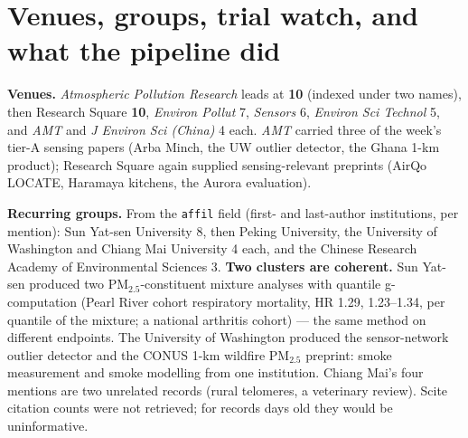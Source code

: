 \documentclass[10pt]{article}
\begin{document}
\vspace{4mm}

\par{}\baselineskip{}\baselineskip
\section*{\sffamily\bfseries\color{Deep}Venues, groups, trial watch, and what the pipeline did}
\vspace{-1.5mm}{\color{Teal}\rule{\linewidth}{1.1pt}}\vspace{2.5mm}

\footnotesize
\textbf{Venues.} \textit{Atmospheric Pollution Research} leads at \textbf{10} (indexed under two names), then
Research Square \textbf{10}, \textit{Environ Pollut} 7, \textit{Sensors} 6, \textit{Environ Sci Technol} 5, and
\textit{AMT} and \textit{J Environ Sci (China)} 4 each. \textit{AMT} carried three of the week's tier-A sensing papers
(Arba Minch, the UW outlier detector, the Ghana 1-km product); Research Square again supplied sensing-relevant
preprints (AirQo LOCATE, Haramaya kitchens, the Aurora evaluation).

\vspace{1.5mm}
\textbf{Recurring groups.} From the \texttt{affil} field (first- and last-author institutions, per mention): Sun
Yat-sen University 8, then Peking University, the University of Washington and Chiang Mai University 4 each, and the
Chinese Research Academy of Environmental Sciences 3. \textbf{Two clusters are coherent.} Sun Yat-sen produced two
PM$_{2.5}$-constituent mixture analyses with quantile g-computation (Pearl River cohort respiratory mortality, HR
1.29, 1.23--1.34, per quantile of the mixture; a national arthritis cohort) --- the same method on different
endpoints. The University of Washington produced the sensor-network outlier detector and the CONUS 1-km wildfire
PM$_{2.5}$ preprint: smoke measurement and smoke modelling from one institution. Chiang Mai's four mentions are two
unrelated records (rural telomeres, a veterinary review). Scite citation counts were not retrieved; for records days
old they would be uninformative.
\end{document}
